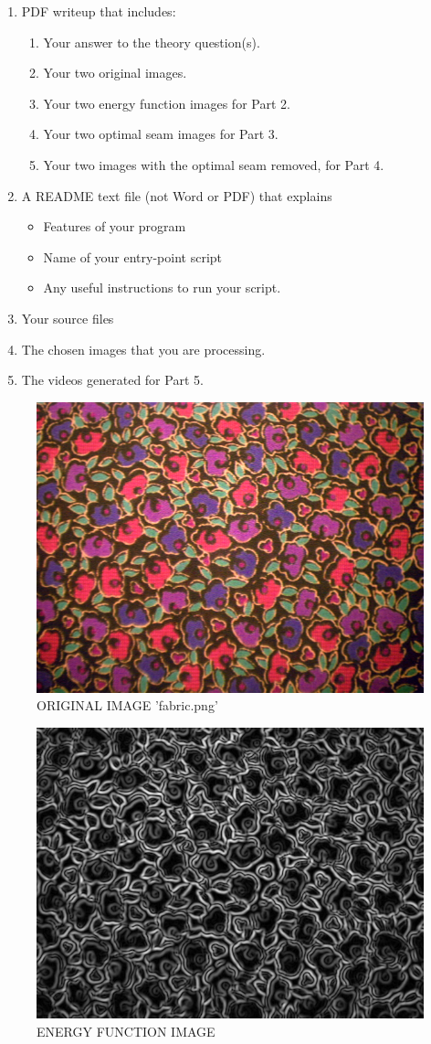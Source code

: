 \documentclass[12pt]{article}
\begin{document}
\begin{enumerate}
\item PDF writeup that includes:
\begin{enumerate}
\item Your answer to the theory question(s).
\item Your two original images.
\item Your two energy function images for Part 2.
\item Your two optimal seam images for Part 3.
\item Your two images with the optimal seam removed, for Part 4.
\end{enumerate}
\item A README text file (not Word or PDF) that explains
\begin{itemize}
\item Features of your program
\item Name of your entry-point script
\item Any useful instructions to run your script.
\end{itemize}
\item Your source files
\item The chosen images that you are processing.
\item The videos generated for Part 5.
\end{enumerate}

\newpage
\begin{figure}
	\centering
	\includegraphics[width=0.7\linewidth]{fabric}
	\caption{ORIGINAL IMAGE 'fabric.png'}
	\label{fig:fabric}
\end{figure}

\begin{figure}
	\centering
	\includegraphics[width=0.7\linewidth]{fabric_energy}
	\caption{ENERGY FUNCTION IMAGE}
	\label{fig:fabricenergy}
\end{figure}
\end{document}
